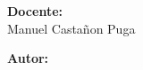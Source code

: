 \documentclass{article}
\begin{document}
\begin{titlepage}
\begin{minipage}{0.8\textwidth}
            \vspace*{4cm}
            \hrulefill \par
            \vspace*{1cm}

            \large
            \mdseries	
            \textbf{Docente:} \\
            Manuel Castañon Puga
            
            \vspace*{1cm}
            
            \textbf{Autor:} \\ 
            \@author
        \end{minipage}
    \end{titlepage}
\end{document}
